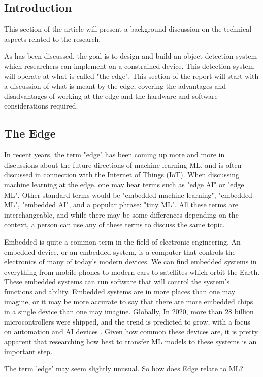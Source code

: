 \documentclass[conference]{IEEEtran}
\begin{document}
\subsection{Introduction}
This section of the article will present a background discussion on the technical aspects related to the research. 

As has been discussed, the goal is to design and build an object detection system which researchers can implement on a constrained device. This detection system will operate at what is called "the edge". This section of the report will start with a discussion of what is meant by the edge, covering the advantages and disadvantages of working at the edge and the hardware and software considerations required. 

\subsection{The Edge}
In recent years, the term "edge" has been coming up more and more in discussions about the future directions of machine learning ML, and is often discussed in connection with the Internet of Things (IoT). When discussing machine learning at the edge, one may hear terms such as "edge AI" or "edge ML". Other standard terms would be "embedded machine learning", "embedded ML", "embedded AI", and a popular phrase: "tiny ML". All these terms are interchangeable, and while there may be some differences depending on the context, a person can use any of these terms to discuss the same topic.

Embedded is quite a common term in the field of electronic engineering. An embedded device, or an embedded system, is a computer that controls the electronics of many of today's modern devices. We can find embedded systems in everything from mobile phones to modern cars to satellites which orbit the Earth. These embedded systems can run software that will control the system's functions and ability.
Embedded systems are in more places than one may imagine, or it may be more accurate to say that there are more embedded chips in a single device than one may imagine. Globally, In 2020, more than 28 billion microcontrollers were shipped, and the trend is predicted to grow, with a focus on automation and AI devices \cite{b3}. Given how common these devices are, it is pretty apparent that researching how best to transfer ML models to these systems is an important step.

The term 'edge' may seem slightly unusual. So how does Edge relate to ML? 
\end{document}
